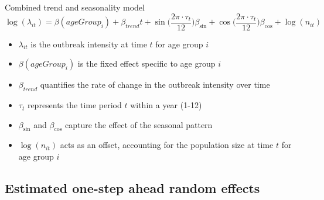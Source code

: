 \documentclass[aspectratio=169]{beamer}
\begin{document}
\begin{frame}{Combined trend and seasonality model}
\begin{equation}\label{eq:AgegroupTrendSeasonality}
  \log(\lambda_{it})=\beta(ageGroup_{i}) + \beta_{trend} t + \sin \bigg(\frac{2\pi\cdot \tau_t}{12}\bigg) \beta_{\sin} + \cos \bigg(\frac{2\pi\cdot \tau_t}{12}\bigg)\beta_{\cos} + \log(n_{it})
\end{equation}

\begin{itemize}
  \item $\lambda_{it}$ is the outbreak intensity at time $t$ for age group $i$
  \item $\beta(ageGroup_{i})$ is the fixed effect specific to age group $i$
  \item $\beta_{trend}$ quantifies the rate of change in the outbreak intensity over time
  \item $\tau_t$ represents the time period $t$ within a year (1-12)
  \item $\beta_{\sin}$ and $\beta_{\cos}$ capture the effect of the seasonal pattern
  \item $\log(n_{it})$ acts as an offset, accounting for the population size at time $t$ for age group $i$
\end{itemize}
\end{frame}

\hypertarget{estimated-one-step-ahead-random-effects}{%
\subsection{Estimated one-step ahead random
effects}\label{estimated-one-step-ahead-random-effects}}
\end{document}
